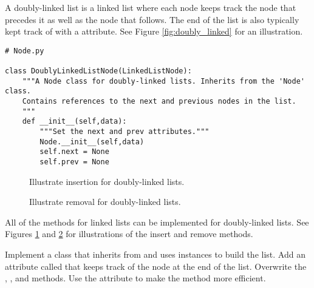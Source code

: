 A doubly-linked list is a linked list where each node keeps track the node that precedes it as well as the node that follows.
The end of the list is also typically kept track of with a  attribute.
See Figure \ref{fig:doubly_linked} for an illustration.


\begin{lstlisting}
# Node.py

class DoublyLinkedListNode(LinkedListNode):
	"""A Node class for doubly-linked lists. Inherits from the 'Node' class.
	Contains references to the next and previous nodes in the list.
	"""
	def __init__(self,data):
		"""Set the next and prev attributes."""
		Node.__init__(self,data)
		self.next = None
		self.prev = None
\end{lstlisting}

\begin{figure}
\centering
\caption{Illustrate insertion for doubly-linked lists.}
\label{fig:d_insertion}
\end{figure}

\begin{figure}
\centering
\caption{Illustrate removal for doubly-linked lists.}
\label{fig:d_removal}
\end{figure}


All of the methods for linked lists can be implemented for doubly-linked lists.
See Figures \ref{fig:d_insertion} and \ref{fig:d_removal} for illustrations of the insert and remove methods.

\begin{problem}
Implement a  class that inherits from  and uses  instances to build the list.
Add an attribute called  that keeps track of the node at the end of the list.
Overwrite the , , and  methods.
Use the  attribute to make the  method more efficient.
\end{problem}

